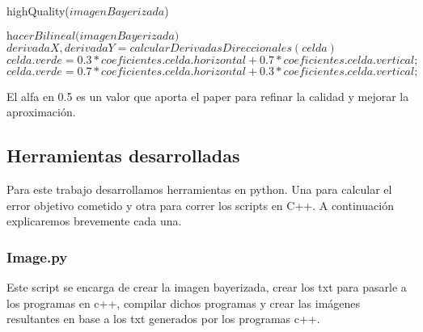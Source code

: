 \begin{algorithm}
\caption{highQuality($imagenBayerizada$)}\label{euclid}
\begin{algorithmic}[1]
\State $\textit{hacerBilineal(imagenBayerizada)}$
      \State $derivadaX,derivadaY = calcularDerivadasDireccionales(celda)$
        \State \textit{$celda.verde = 0.3 * coeficientes.celda.horizontal + 0.7 * coeficientes.celda.vertical;$}
      \Else
        \State \textit{$celda.verde = 0.7 * coeficientes.celda.horizontal + 0.3 * coeficientes.celda.vertical;$}
      \EndIf
  \EndIf
\EndFor
\end{algorithmic}
\end{algorithm}


El alfa en 0.5 es un valor que aporta el paper para refinar la calidad y mejorar la aproximación.
\clearpage
\subsection{Herramientas desarrolladas}

Para este trabajo desarrollamos herramientas en python. Una para calcular el error objetivo cometido y otra para correr los scripts en C++. A continuación explicaremos brevemente cada una.

\subsubsection{Image.py}

Este script se encarga de crear la imagen bayerizada, crear los txt para pasarle a los programas en c++, compilar dichos programas y crear las imágenes resultantes en base a los txt generados por los programas c++.

